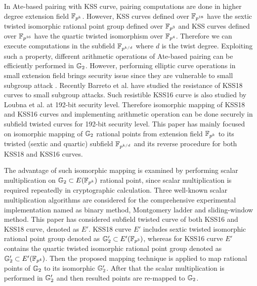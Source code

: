 In Ate-based pairing with KSS curve,  pairing computations are done in higher degree extension field $\mathbb{F}_{p^k}$.
However, KSS curves defined over $\mathbb{F}_{p^{18}}$ have the sextic twisted isomorphic rational point group defined over $\mathbb{F}_{p^3}$ and KSS curves defined over $\mathbb{F}_{p^{16}}$ have the quartic twisted  isomorphism over $\mathbb{F}_{p^4}$. 
Therefore we can execute computations in the subfield $\mathbb{F}_{p^{k/d}}$ where $d$ is the twist degree. 
Exploiting such a property, different arithmetic operations of Ate-based pairing can be efficiently performed in ${\mathbb{G}}_{2}$.  
However, performing elliptic curve operations in small extension field brings security issue since they are vulnerable to small subgroup attack \cite{C:LimLee97}. 
Recently Barreto et al. \cite{LC:BCMNPZ15} have studied the resistance of  KSS18 curves to small subgroup attacks. 
Such resistible KSS16 curve is also studied by Loubna et al. \cite{EPRINT:GhaFou16b} at 192-bit security level. 
Therefore isomorphic mapping of KSS18 and KSS16 curves and implementing arithmetic operation can be done securely in subfield twisted curves for 192-bit security level.
This paper has mainly focused on isomorphic mapping of ${\mathbb{G}}_{2}$ rational points from extension field $\mathbb{F}_{p^k}$ to its twisted (sextic and quartic) subfield $\mathbb{F}_{p^{k/d}}$ and its reverse procedure for both KSS18 and KSS16 curves. 

The advantage of such isomorphic mapping is examined by performing scalar multiplication on ${\mathbb{G}}_{2} \subset E(\mathbb{F}_{p^k})$ rational point, since scalar multiplication is required repeatedly in cryptographic calculation. 
Three well-known scalar multiplication algorithms are considered for the comprehensive experimental implementation named as binary method, Montgomery ladder and sliding-window method.
This paper has considered subfield  twisted curve of both  KSS16 and KSS18 curve, denoted as $E'$. 
KSS18 curve $E'$ includes sextic twisted isomorphic rational point group denoted as ${\mathbb{G}}_{2}' \subset E'(\mathbb{F}_{p^3})$, whereas  for KSS16 curve $E'$ contains the quartic twisted  isomorphic rational point group denoted as ${\mathbb{G}}_{2}' \subset E'(\mathbb{F}_{p^4})$.
Then the proposed mapping technique is applied to map rational points of ${\mathbb{G}}_{2}$ to its isomorphic ${\mathbb{G}}_{2}'$. 
After that the scalar multiplication  is performed  in ${\mathbb{G}}_{2}'$ and then resulted points are re-mapped to ${\mathbb{G}}_{2}$.

